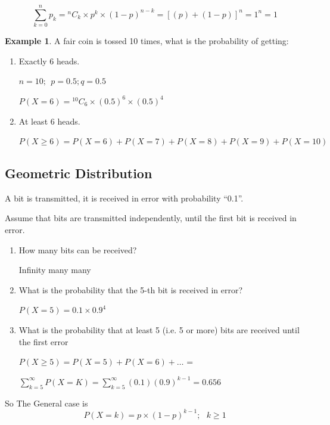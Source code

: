 \documentclass[12pt]{article}
\theoremstyle{definition}
\newtheorem{exmp}{Example}[section]
\newcommand*{\Comb}[2]{{}^{#1}C_{#2}}%
\begin{document}
\begin{equation}
    \sum_{k = 0}^{n} p_k  = \Comb{n}{k} \times p^k \times (1-p)^{n - k} = [(p)+(1-p)]^n = 1 ^ n = 1
\end{equation}    
\begin{exmp}
A fair coin is tossed 10 times, what is the probability of getting:
\begin{enumerate}
    \item  Exactly 6 heads.
        \begin{center}
            $ n = 10; \ \ p = 0.5; q = 0.5 $ 
        \end{center}   
        \begin{center}
            $P(X = 6) = \Comb{10}{6} \times (0.5)^6 \times (0.5)^4   $ 
        \end{center}   
    \item  At least 6 heads.
        \begin{center}
            $P(X \geq 6) = P(X = 6) + P(X = 7) + P(X = 8) + P(X = 9) + P(X = 10)  $
        \end{center}   
\end{enumerate}
\end{exmp}    

\subsection{Geometric Distribution}

A bit is transmitted, it is received in error with probability “0.1”.

Assume that bits are transmitted independently, until the first bit is received
in error.
\begin{enumerate}

    \item How many bits can be received?
        \begin{center}
            Infinity many many
        \end{center}
    \item What is the probability that the 5-th bit is received in error?
        \begin{center}
            $  P(X = 5) = 0.1 \times 0.9^4 $
        \end{center}
    \item What is the probability that at least 5 (i.e. 5 or more) bits are received until the first error
        \begin{center}
            $  P(X \geq 5) = P(X = 5) + P(X = 6) + \dots $  =
        \end{center}
        \begin{center}
            $  \displaystyle \sum_{k = 5}^{\infty} P(X = K) = \sum_{k = 5}^{\infty}(0.1)(0.9)^{k-1} = 0.656$
        \end{center}

\end{enumerate}
So The General case is 
\begin{equation}
    P(X = k) = p \times (1 - p)^{k-1} ; \ \ \ k \geq 1
\end{equation}    
\end{document}
